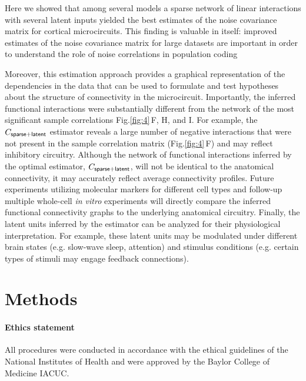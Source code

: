 \documentclass[10pt]{article}
\newcommand{\figref}[2]{Fig.\;\ref{fig:#1}\,#2}
\begin{document}
Here we showed that among several models a sparse network of linear interactions with several latent inputs yielded the best estimates of the noise covariance matrix for cortical microcircuits.  This finding is valuable in itself: improved estimates of the noise covariance matrix for large datasets are important in order to understand the role of noise correlations in population coding \cite{Abbott:1999, Sompolinsky:2001, Averbeck:2006, Ecker:2011}  

Moreover, this estimation approach provides a graphical representation of the dependencies in the data that can be used to formulate and test hypotheses about the structure of connectivity in the microcircuit. Importantly, the inferred functional interactions were substantially different from the network of the most significant sample correlations \figref{4}{F, H, and I}.  For example, the $C_{\sf sparse+latent}$ estimator reveals a large number of negative interactions that were not present in the sample correlation matrix (\figref{4}{F}) and may reflect inhibitory circuitry.  Although the network of functional interactions inferred by the optimal estimator, $C_{\sf sparse+latent}$, will not be identical to the anatomical connectivity, it may accurately reflect average connectivity profiles. Future experiments utilizing molecular markers for different cell types and follow-up multiple whole-cell \emph{in vitro} experiments \cite{Hofer:2011, Ko:2013} will directly compare the inferred functional connectivity graphs to the underlying anatomical circuitry. Finally, the latent units inferred by the estimator can be analyzed for their physiological interpretation. For example, these latent units may be modulated under different brain states (e.g. slow-wave sleep, attention) and stimulus conditions (e.g. certain types of stimuli may engage feedback connections). 

\section*{Methods}
\paragraph{Ethics statement}
All procedures were conducted in accordance with the ethical guidelines of the National Institutes of Health and were approved by the Baylor College of Medicine IACUC. 
\end{document}
